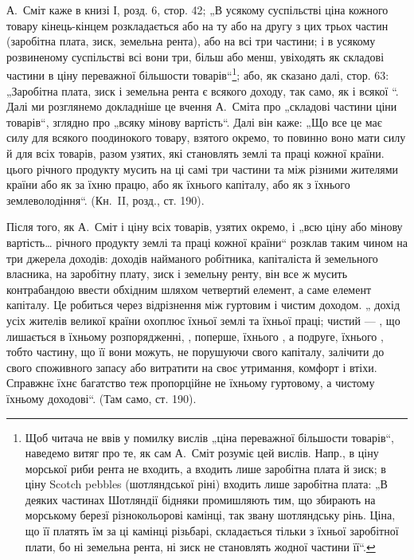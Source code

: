 А.~Сміт каже в книзі І, розд. 6, стор. 42; „В усякому суспільстві
ціна кожного товару кінець-кінцем розкладається або на ту або на другу
з цих трьох частин (заробітна плата, зиск, земельна рента), або на всі
три частини; і в усякому розвиненому суспільстві всі вони три, більш
або менш, увіходять як складові частини в ціну переважної більшости
товарів“\footnote{
Щоб читача не ввів у помилку вислів „ціна переважної більшости товарів“,
наведемо витяг про те, як сам А.~Сміт розуміє цей вислів. Напр., в ціну морської
риби рента не входить, а входить лише заробітна плата й зиск; в ціну Scotch
pebbles (шотляндської ріні) входить лише заробітна плата: „В деяких частинах
Шотляндії бідняки промишляють тим, що збирають на морському березї різнокольорові
камінці, так звану шотляндську рінь. Ціна, що її платять їм за ці камінці
різьбарі, складається тільки з їхньої заробітної плати, бо ні земельна рента, ні
зиск не становлять жодної частини її“.
}; або, як сказано далі, стор. 63: „Заробітна плата, зиск і земельна
рента є  всякого доходу, так само,
як і всякої “. Далі ми розглянемо докладніше це
вчення А.~Сміта про „складові частини ціни товарів“, зглядно про „всяку
мінову вартість“. Далі він каже: „Що все це має силу для всякого
поодинокого товару, взятого окремо, то повинно воно мати силу й для
всіх товарів, разом узятих, які становлять 
землі та праці кожної країни. 
цього річного продукту мусить  на ці самі три частини
та  між різними жителями країни або як  за
їхню працю, або як  їхнього капіталу, або як  з їхнього
землеволодіння“. (Кн.~II, розд., ст. 190).

Після того, як А.~Сміт і ціну всіх товарів, узятих окремо, і „всю ціну
або мінову вартість\dots{} річного продукту землі та праці кожної країни“
розклав таким чином на три джерела доходів: доходів найманого робітника,
капіталіста й земельного власника, на заробітну плату, зиск і земельну
ренту, він все ж мусить контрабандою ввести обхідним шляхом
четвертий елемент, а саме елемент капіталу. Це робиться через відрізнення
між гуртовим і чистим доходом. „ дохід усіх жителів великої
країни охоплює  їхньої землі та їхньої праці;
чистий  — , що лишається в їхньому розпорядженні,
, поперше, їхнього ,
а подруге, їхнього , тобто
частину, що її вони можуть, не порушуючи свого капіталу, залічити
до свого споживного запасу або витратити на своє утримання, комфорт
і втіхи. Справжнє їхнє багатство теж пропорційне не їхньому гуртовому,
а чистому їхньому доходові“. (Там само, ст. 190).

